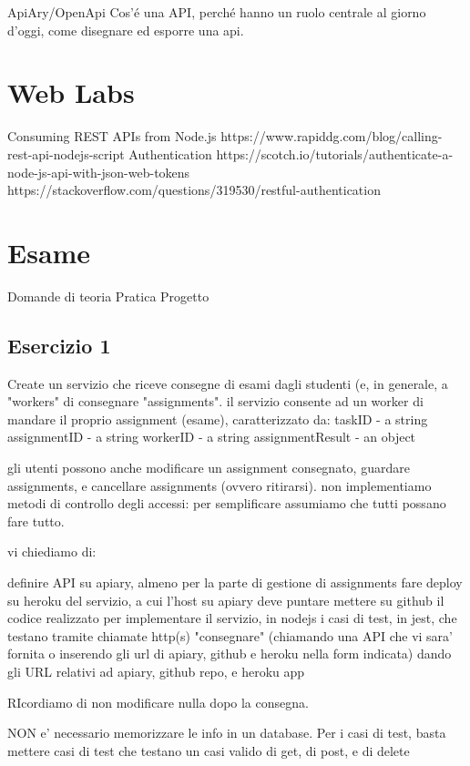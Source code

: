 \begin{itemize}
ApiAry/OpenApi
Cos'\'e una API, perch\'e hanno un ruolo centrale al giorno d'oggi,
come disegnare ed esporre una api.


\chapter{Web Labs}

Consuming REST APIs from Node.js
	https://www.rapiddg.com/blog/calling-rest-api-nodejs-script
Authentication
	https://scotch.io/tutorials/authenticate-a-node-js-api-with-json-web-tokens
	https://stackoverflow.com/questions/319530/restful-authentication

\chapter{Esame}
Domande di teoria
Pratica
Progetto
\section{Esercizio 1}
Create un servizio che riceve consegne di esami dagli studenti (e, in generale, a "workers" di consegnare "assignments". il servizio consente ad un worker di mandare il proprio assignment (esame), caratterizzato da:
	taskID - a string 
	assignmentID - a string
	workerID - a string
	assignmentResult - an object

gli utenti possono anche modificare un assignment consegnato, guardare assignments, e cancellare assignments (ovvero ritirarsi).
non implementiamo metodi di controllo degli accessi: per semplificare assumiamo che tutti possano fare tutto.

vi chiediamo di:

    definire API su apiary, almeno per la parte di gestione di assignments
    fare deploy su heroku del servizio, a cui l'host su apiary deve puntare
    mettere su github 
        il codice realizzato per implementare il servizio, in nodejs
        i casi di test, in jest, che testano tramite chiamate http(s)
    "consegnare" (chiamando una API che vi sara' fornita o inserendo gli url di apiary, github e heroku nella form indicata) dando gli URL relativi ad apiary, github repo, e heroku app

RIcordiamo di non modificare nulla dopo la consegna.

NON e' necessario memorizzare le info in un database.
Per i casi di test, basta mettere casi di test che testano un casi valido di get, di post, e di delete


\end{itemize}
